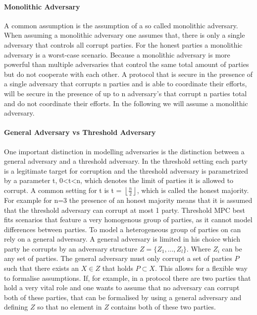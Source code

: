 \paragraph{Monolithic Adversary}
A common assumption is the assumption of a so called monolithic adversary. When assuming a monolithic adversary one assumes that, there is only a single adversary that controls all corrupt parties. For the honest parties a monolithic adversary is a worst-case scenario. Because a monolithic adversary is more powerful than multiple adversaries that control the same total amount of parties but do not cooperate with each other. A protocol that is secure in the presence of a single adversary that corrupts n parties and is able to coordinate their efforts, will be secure in the presence of up to n adversary's that corrupt n parties total and do not coordinate their efforts. In the following we will assume a monolithic adversary.
\paragraph{General Adversary vs Threshold Adversary}
One important distinction in modelling adversaries is the distinction between a general adversary and a threshold adversary.
In the threshold setting each party is a legitimate target for corruption and the threshold adversary is parametrized by a parameter t, 0<t<n, which denotes the limit of parties it is allowed to corrupt. A common setting for t is t = $\left \lfloor{ \frac{n}{2} }\right \rfloor  $, which is called the honest majority. For example for n=3 the presence of an honest majority means that it is assumed that the threshold adversary can corrupt at most 1 party. Threshold MPC best fits scenarios that feature a very homogenous group of parties, as it cannot model differences between parties. To model a heterogeneous group of parties on can rely on a general adversary.  A general adversary is limited in his choice which party he corrupts by an adversary structure  
$ Z = \{ Z_1, \dots, Z_l  \} $. Where $ Z_i $ can be any set of parties. The general adversary must only corrupt a set of parties  $ P $ such that there exists an $ X \in Z $ that holds $ P \subset X $. This allows for a flexible way to formalise assumptions. If, for example, in a protocol there are two parties that hold a very vital role and one wants to assume that no adversary can corrupt both of these parties, that can be formalised by using a general adversary and defining $ Z $ so that no element in  $Z $ contains both of these two parties.  
 
